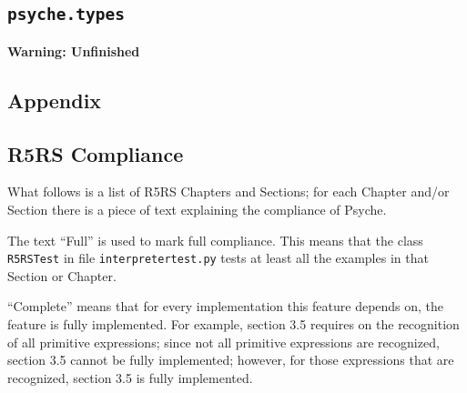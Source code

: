 \documentclass{report}
\newcommand{\code}[1]{\texttt{#1}}
\newcommand{\TODO}{\textbf{Warning: Unfinished} \\}
\begin{document}
\chapter{\code{psyche.types}}
\label{chap:psyche.types}
\TODO{}

\begin{latexonly}
\part{Appendix}
\end{latexonly}
\appendix

%
%
\chapter{R5RS Compliance}
\label{app:compliance}

What follows is a list of R5RS Chapters and Sections; for each Chapter
and/or Section there is a piece of text explaining the compliance of
Psyche. 

The text ``Full'' is used to mark full compliance. This means that the
class \code{R5RSTest} in file \code{interpretertest.py} tests at
least all the examples in that Section or Chapter.

``Complete'' means that for every implementation this feature depends
on, the feature is fully implemented. For example, section 3.5
requires on the recognition of all primitive expressions; since not
all primitive expressions are recognized, section 3.5 cannot be fully
implemented; however, for those expressions that are recognized,
section 3.5 is fully implemented.
\end{document}
